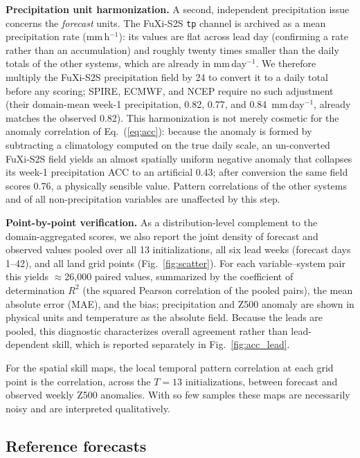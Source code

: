 \documentclass[11pt]{article}
\begin{document}
\textbf{Precipitation unit harmonization.} A second, independent
precipitation issue concerns the \emph{forecast} units. The FuXi-S2S
\texttt{tp} channel is archived as a mean precipitation rate
(mm\,h$^{-1}$): its values are flat across lead day (confirming a rate
rather than an accumulation) and roughly twenty times smaller than the
daily totals of the other systems, which are already in mm\,day$^{-1}$.
We therefore multiply the FuXi-S2S precipitation field by 24 to convert
it to a daily total before any scoring; SPIRE, ECMWF, and NCEP require no
such adjustment (their domain-mean week-1 precipitation, 0.82, 0.77, and
0.84~mm\,day$^{-1}$, already matches the observed 0.82). This
harmonization is not merely cosmetic for the anomaly correlation of
Eq.~(\ref{eq:acc}): because the anomaly is formed by subtracting a
climatology computed on the true daily scale, an un-converted FuXi-S2S
field yields an almost spatially uniform negative anomaly that collapses
its week-1 precipitation ACC to an artificial 0.43; after conversion the
same field scores 0.76, a physically sensible value. Pattern
correlations of the other systems and of all non-precipitation variables
are unaffected by this step.

\textbf{Point-by-point verification.} As a distribution-level complement
to the domain-aggregated scores, we also report the joint density of
forecast and observed values pooled over all 13 initializations, all six
lead weeks (forecast days 1--42), and all land grid points
(Fig.~\ref{fig:scatter}). For each variable--system pair this yields
$\approx$26{,}000 paired values, summarized by the coefficient of
determination $R^{2}$ (the squared Pearson correlation of the pooled
pairs), the mean absolute error (MAE), and the bias; precipitation and
Z500 anomaly are shown in physical units and temperature as the absolute
field. Because the leads are pooled, this diagnostic characterizes
overall agreement rather than lead-dependent skill, which is reported
separately in Fig.~\ref{fig:acc_lead}.

For the spatial skill maps, the local temporal pattern correlation at
each grid point is the correlation, across the $T=13$ initializations,
between forecast and observed weekly Z500 anomalies. With so few samples
these maps are necessarily noisy and are interpreted qualitatively.

\subsection{Reference forecasts}\label{sec:baselines}
\end{document}
